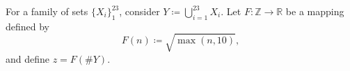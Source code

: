 \documentclass[varwidth=9cm]{standalone}
\begin{document}
For a family of sets $\{X_i\}_1^{23}$, consider $Y \coloneqq \bigcup_{i=1}^{23} X_i$.
Let $F\colon \mathbb{Z} \to \mathbb{R}$ be a mapping defined by
\begin{equation}
    F(n) \coloneqq \sqrt{ \max( n, 10 ) },
\end{equation}
and define $z=F(\# Y)$.
\end{document}

